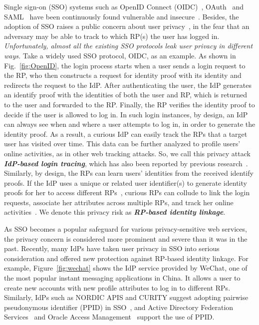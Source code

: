 Single sign-on (SSO) systems such as OpenID Connect (OIDC)~\cite{OpenIDConnect}, OAuth~\cite{rfc6749} and SAML~\cite{SAML} have been continuously found vulnerable and insecure~\cite{WangCW12,ccsSunB12,SomorovskyMSKJ12,ArmandoCCCPS13,DiscoveringJCS,dimvaLiM16,WangZLG16,MainkaMS16, MainkaMSW17,YangLCZ18}. Besides, the adoption of SSO raises a public concern about user privacy~\cite{maler2008venn,NIST2017draft,BrowserID,SPRESSO}, in the fear that an adversary may be able to track to which RP(s) the user has logged in. {\em Unfortunately, almost all the existing SSO protocols leak user privacy in different ways.} Take a widely used SSO protocol, OIDC, as an example. As shown in Fig.~\ref{fig:OpenID}, the login process starts when a user sends a login request to the RP, %
who then constructs a request for identity proof with its identity and redirects the request to the IdP. %
After authenticating the user, the IdP generates an identify proof with the identities of both the user and RP, %
which is returned to the user and forwarded to the RP. %
Finally, the RP verifies the identity proof to decide if the user is allowed to log in. In such login instances, by design, an IdP can always see when and where a user attempts to log in, in order to generate the identity proof. As a result, a curious IdP can easily track the RPs that a target user has visited over time. This data can be further analyzed to profile users' online activities, as in other web tracking attacks. So, we call this privacy attack \textbf{\em IdP-based login tracing}, which has also been reported by previous research~\cite{BrowserID,SPRESSO}. Similarly, by design, the RPs can learn users' identities from the received identify proofs. If the IdP uses a unique or related user identifier(s) to generate identity proofs for her to access different RPs~\cite{Google, FirefoxAccount}, curious RPs can collude to link the login requests, associate her attributes across multiple RPs, and track her online activities~\cite{maler2008venn}. We denote this privacy risk as \textbf{\em RP-based identity linkage}.

As SSO becomes a popular safeguard for various privacy-sensitive web services, the privacy concern is considered more prominent and severe than it was in the past. Recently, many IdPs have taken user privacy in SSO into serious consideration and offered new protection against RP-based identity linkage. For example, Figure~\ref{fig:wechat} shows the IdP service provided by WeChat, one of the most popular instant messaging applications in China. It allows a user to create new accounts with new profile attributes to log in to different RPs. Similarly, IdPs such as NORDIC APIS and CURITY suggest adopting pairwise pseudonymous identifier (PPID) in SSO~\cite{Nordic, Curity}, and Active Directory Federation Services~\cite{MS} and Oracle Access Management~\cite{Oracle} support the use of PPID.


